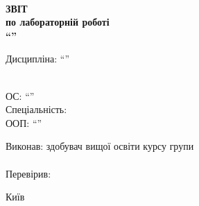 
\newlength{\rightshift}
\setlength{\rightshift}{35pt}

\thispagestyle{empty}

{%
\begin{Center}
	{\large\university{}\\
	\faculty{}}
\end{Center}

\vspace*{\fill}

\begin{Center}
	 {\bfseries\Large
		 ЗВІТ\\
		 по лабораторній роботі \prodnumber{}\\
		 \enquote{\worktheme{}}
	 }
\end{Center}

\vspace*{.6cm}

\begin{Center}
	Дисципліна: \enquote{\subjectname{}}
\end{Center}

\vspace*{.8cm}

\begin{RaggedRight}
	\faculty\\
	ОС: \enquote{\os}\\
	Спеціальність: \speciality\\
	ООП: \enquote{\oop}
\end{RaggedRight}

\vspace*{\fill}

\begin{RaggedRight}
	Виконав: здобувач вищої освіти \course{} курсу \groupnumber{} групи\\
	\studentname{}\\
	Перевірив: \teacher{}
\end{RaggedRight}

\vspace*{\fill}

\begin{Center}
	Київ \the\year{}
\end{Center}
}

\pagebreak
\hypertarget{tocLink}{{\sffamily\tableofcontents}}
\pagebreak